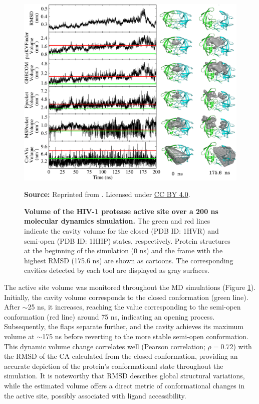 \documentclass[Ingles]{phdthesis}
\begin{document}
\begin{figure}[h]
  \centerline{\includegraphics[scale=1.2]{images/hiv1-protease-md-analysis.png}}
  \centerline{\tiny{\textbf{Source:} Reprinted from \cite{guerra2020}. Licensed under \href{https://creativecommons.org/licenses/by/4.0/}{CC BY 4.0}.}}
  \caption[Volume of the HIV-1 protease active site over a 200 ns molecular dynamics simulation]{\textbf{Volume of the HIV-1 protease active site over a 200 ns molecular dynamics simulation.} The green and red lines indicate the cavity volume for the closed (PDB ID: 1HVR) and semi-open (PDB ID: 1HHP) states, respectively. Protein structures at the beginning of the simulation (0 ns) and the frame with the highest \acs{RMSD} (175.6 ns) are shown as cartoons. The corresponding cavities detected by each tool are displayed as gray surfaces.}
  \label{fig:hiv1-protease-dm-analysis}
\end{figure}

The active site volume was monitored throughout the \acs{MD} simulations (Figure \ref{fig:hiv1-protease-dm-analysis}). Initially, the cavity volume corresponds to the closed conformation (green line). After $\sim$25 ns, it increases, reaching the value corresponding to the semi-open conformation (red line) around 75 ns, indicating an opening process. Subsequently, the flaps separate further, and the cavity achieves its maximum volume at $\sim$175 ns before reverting to the more stable semi-open conformation. This dynamic volume change correlates well (Pearson correlation; $\rho=0.72$) with the \ac{RMSD} of the \acs{CA} calculated from the closed conformation, providing an accurate depiction of the protein's conformational state throughout the simulation. It is noteworthy that \acs{RMSD} describes global structural variations, while the estimated volume offers a direct metric of conformational changes in the active site, possibly associated with ligand accessibility.
\end{document}
